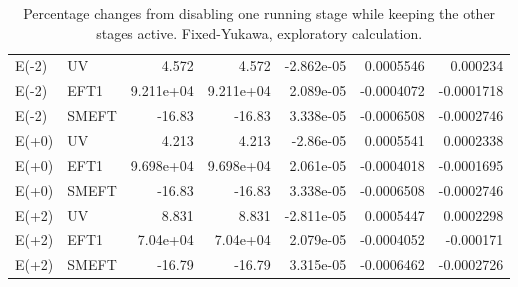 \begin{table}[htbp]
\begin{tabular}{llrrrrr}
E(-2) & UV & 4.572 & 4.572 & -2.862e-05 & 0.0005546 & 0.000234 \\
E(-2) & EFT1 & 9.211e+04 & 9.211e+04 & 2.089e-05 & -0.0004072 & -0.0001718 \\
E(-2) & SMEFT & -16.83 & -16.83 & 3.338e-05 & -0.0006508 & -0.0002746 \\
E(+0) & UV & 4.213 & 4.213 & -2.86e-05 & 0.0005541 & 0.0002338 \\
E(+0) & EFT1 & 9.698e+04 & 9.698e+04 & 2.061e-05 & -0.0004018 & -0.0001695 \\
E(+0) & SMEFT & -16.83 & -16.83 & 3.338e-05 & -0.0006508 & -0.0002746 \\
E(+2) & UV & 8.831 & 8.831 & -2.811e-05 & 0.0005447 & 0.0002298 \\
E(+2) & EFT1 & 7.04e+04 & 7.04e+04 & 2.079e-05 & -0.0004052 & -0.000171 \\
E(+2) & SMEFT & -16.79 & -16.79 & 3.315e-05 & -0.0006462 & -0.0002726 \\
\hline
\end{tabular}
\caption{Percentage changes from disabling one running stage while keeping the other stages active. Fixed-Yukawa, exploratory calculation.}
\label{tab:generalised_running_d-2}
\end{table}
